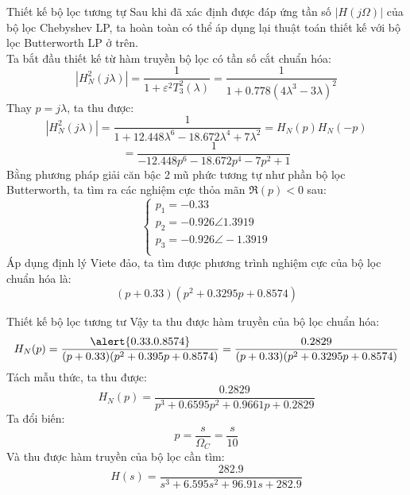 \documentclass[8pt]{beamer}
\begin{document}
\begin{frame}{Thiết kế bộ lọc tương tự}
Sau khi đã xác định được đáp ứng tần số $|H(j\Omega)|$ của bộ lọc Chebyshev LP, ta hoàn toàn có thể áp dụng lại thuật toán thiết kế với bộ lọc Butterworth LP ở trên.
\\ Ta bắt đầu thiết kế từ hàm truyền bộ lọc có \alert{tần số cắt chuẩn hóa}:
$$|H_{N}^2(j\lambda)|=\frac{1}{1+\varepsilon^2 T^2_{3}(\lambda)}=\frac{1}{1+0.778(4\lambda^3-3\lambda)^2}$$
Thay $p=j\lambda$, ta thu được:
$$|H^2_{N}(j\lambda)|=\frac{1}{1+12.448\lambda^6-18.672\lambda^4+7\lambda^2}=H_{N}(p)H_{N}(-p)$$$$=\frac{1}{-12.448p^6-18.672p^4-7p^2+1}$$
Bằng phương pháp giải căn bậc 2 mũ phức tương tự như phần bộ lọc Butterworth, ta tìm ra các nghiệm cực thỏa mãn $\Re{(p)}<0$ sau:
\begin{equation*}
\begin{cases}
	p_{1}=-0.33\\
	p_{2}=-0.926\angle 1.3919\\
	p_{3}=-0.926\angle -1.3919\\
\end{cases}
\end{equation*}
Áp dụng định lý Viete đảo, ta tìm được phương trình nghiệm cực của bộ lọc chuẩn hóa là:
$$(p+0.33)(p^2+0.3295p+0.8574)$$
\end{frame}
\begin{frame}{Thiết kế bộ lọc tương tư}
Vậy ta thu được hàm truyền của bộ lọc chuẩn hóa:
$$H_{N}(p)=\frac{\alert{0.33 . 0.8574}}{(p+0.33)(p^2+0.395p+0.8574)}=\frac{0.2829}{(p+0.33)(p^2+0.3295p+0.8574)}$$
Tách mẫu thức, ta thu được:
$$H_{N}(p)=\frac{0.2829}{p^3+0.6595p^2+0.9661p+0.2829}$$
Ta đổi biến: $$p=\frac{s}{\Omega_{C}}=\frac{s}{10}$$
Và thu được hàm truyền của bộ lọc cần tìm:
$$H(s)=\frac{282.9}{s^3+6.595s^2+96.91s+282.9}$$
\end{frame}
\end{document}
